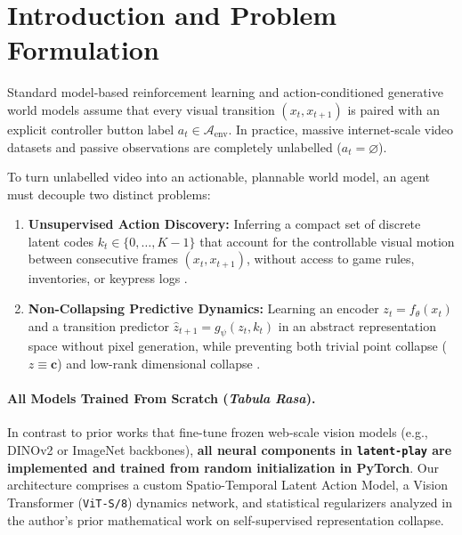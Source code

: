 \documentclass[11pt,letterpaper]{article}
\begin{document}
\section{Introduction and Problem Formulation}
Standard model-based reinforcement learning and action-conditioned generative world models \cite{hafner2023dreamerv3,assran2025vjepa2} assume that every visual transition $(x_t, x_{t+1})$ is paired with an explicit controller button label $a_t \in \mathcal{A}_{\text{env}}$. In practice, massive internet-scale video datasets and passive observations are completely unlabelled ($a_t = \varnothing$).

To turn unlabelled video into an actionable, plannable world model, an agent must decouple two distinct problems:
\begin{enumerate}
  \item \textbf{Unsupervised Action Discovery:} Inferring a compact set of discrete latent codes $k_t \in \{0, \dots, K-1\}$ that account for the controllable visual motion between consecutive frames $(x_t, x_{t+1})$, without access to game rules, inventories, or keypress logs \cite{bruce2024genie,schmidt2023lapo,ye2025lapa}.
  \item \textbf{Non-Collapsing Predictive Dynamics:} Learning an encoder $z_t = f_\theta(x_t)$ and a transition predictor $\hat{z}_{t+1} = g_\psi(z_t, k_t)$ in an abstract representation space without pixel generation, while preventing both trivial point collapse ($z \equiv \mathbf{c}$) and low-rank dimensional collapse \cite{assran2023ijepa,balestriero2025lejepa,bardes2022vicreg}.
\end{enumerate}

\paragraph{All Models Trained From Scratch (\emph{Tabula Rasa}).}
In contrast to prior works that fine-tune frozen web-scale vision models (e.g., DINOv2 or ImageNet backbones), \textbf{all neural components in \texttt{latent-play} are implemented and trained from random initialization in PyTorch}. Our architecture comprises a custom Spatio-Temporal Latent Action Model, a Vision Transformer (\texttt{ViT-S/8}) dynamics network, and statistical regularizers analyzed in the author's prior mathematical work on self-supervised representation collapse.
\end{document}
